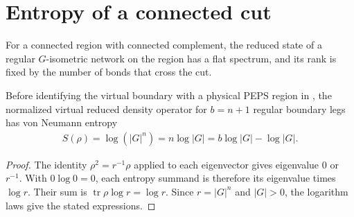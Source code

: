 \section{Entropy of a connected cut}%
\label{sec:peps_connected_cut_entropy}

For a connected region with connected complement, the reduced state of a
regular $G$-isometric network on the region has a flat spectrum, and its rank
is fixed by the number of bonds that cross the cut.

\begin{lemma}%
    \label{thm:peps_regular_boundary_entropy}
    \leanok
    Before identifying the virtual
    boundary with a physical PEPS region in
    \cite[Theorem~6.9]{Schuch2010PEPS}, the normalized virtual reduced
    density operator for $b=n+1$ regular boundary legs has von Neumann entropy
    \begin{align}
        S(\rho)=\log(|G|^n)=n\log|G|=b\log|G|-\log|G|.
    \end{align}
\end{lemma}
\begin{proof}\leanok
    The identity $\rho^2=r^{-1}\rho$ applied to each eigenvector gives
    eigenvalue $0$ or $r^{-1}$. With $0\log0=0$, each entropy summand
    is therefore its eigenvalue times $\log r$. Their sum is
    $\operatorname{tr}\rho\log r=\log r$. Since $r=|G|^n$ and $|G|>0$,
    the logarithm laws give the stated expressions.
\end{proof}

